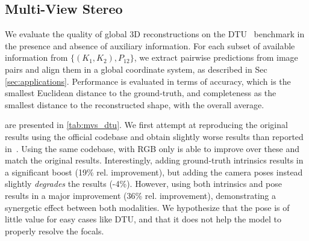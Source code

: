 \begin{figure}
\begin{minipage}{0.65\linewidth}

\end{minipage} \hfill
\begin{minipage}{0.33\linewidth}

\end{minipage}
\vspace{-0.3cm}
\end{figure}

\subsection{Multi-View Stereo}
\label{sec:xp_mvstereo}


We evaluate the quality of global 3D reconstructions on the DTU~\cite{aanaes2016large} benchmark in the presence and absence of auxiliary information.
For each subset of available information from $\{(K_1,K_2),P_{12}\}$, we extract pairwise predictions from image pairs and align them in a global coordinate system, as described in Sec \ref{sec:applications}.
Performance is evaluated in terms of accuracy, which is the smallest Euclidean distance to the ground-truth, and completeness as the smallest distance to the reconstructed shape, with the overall average.

are presented in \cref{tab:mvs_dtu}. 
We first attempt at reproducing the original \duster{} results using the official codebase and obtain slightly worse results than reported in~\cite{wang2024dust3r}.
Using the same codebase, \ours{} with RGB only is able to improve over these and match the original results.
Interestingly, adding ground-truth intrinsics results in a significant boost (19\% rel. improvement), but adding the camera poses instead slightly \emph{degrades} the results (-4\%).
However, using both intrinsics and pose results in a major improvement (36\% rel. improvement), demonstrating a synergetic effect between both modalities.
We hypothesize that the pose is of little value for easy cases like DTU, and that it does not help the model to properly resolve the focals.


\begin{table}[]
    \centering
    \resizebox{\linewidth}{!}{}
    \vspace{-0.3cm}
    \caption{\textbf{Multiview pose estimation on the CO3Dv2 and RealEstate10K.} 
    (a) denotes multiview methods, while (b) denotes pairwise methods.
    \ours{} with Procrustes alignment (Pro) performs better than \duster{} (PnP) and other multi-view based pose estimation approaches, and even more so with known intrinsics, while being much faster. 
    RealEstate10K is not in the training set.
    }
    \label{tab:multiview}
    \vspace{-0.5cm}
\end{table}

